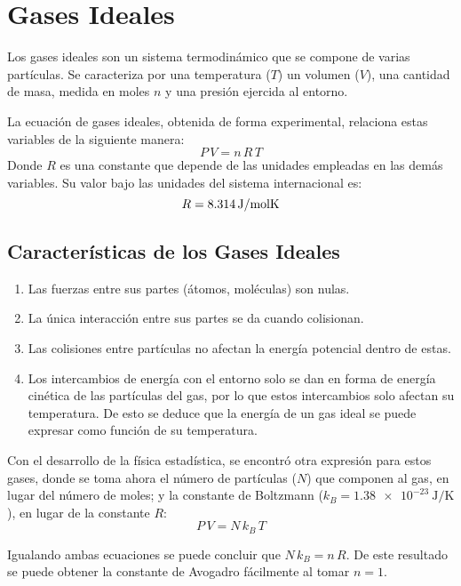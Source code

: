 \section{Gases Ideales}

Los gases ideales son un sistema termodinámico que se compone de varias
partículas. Se caracteriza por una temperatura ($T$) un volumen ($V$),
una cantidad de masa, medida en moles $n$ y una presión ejercida al
entorno.

\begin{center}
\end{center}

La ecuación de gases ideales, obtenida de forma experimental, relaciona
estas variables de la siguiente manera:
\[P\,V = n\,R\,T\]
Donde $R$ es una constante que depende de las unidades empleadas en las
demás variables. Su valor bajo las unidades del sistema internacional es:
\[R = \qty{8.314}{\joule\per{\mol \kelvin}}\]

\subsection{Características de los Gases Ideales}
\begin{enumerate}
  \item Las fuerzas entre sus partes (átomos, moléculas) son nulas.
  \item La única interacción entre sus partes se da cuando colisionan.
  \item Las colisiones entre partículas no afectan la energía potencial
        dentro de estas.
  \item Los intercambios de energía con el entorno solo se dan en forma
        de energía cinética de las partículas del gas, por lo que estos
        intercambios solo afectan su temperatura. De esto se deduce que
        la energía de un gas ideal se puede expresar como función de su
        temperatura.
\end{enumerate}

Con el desarrollo de la física estadística, se encontró otra expresión
para estos gases, donde se toma ahora el número de partículas ($N$) que
componen al gas, en lugar del número de moles; y la constante de
Boltzmann ($k_B = \qty{1.38e-23}{\joule\per\kelvin}$), en lugar de la
constante $R$:
\[P\,V = N\,k_B\,T\]

Igualando ambas ecuaciones se puede concluir que $N\,k_B = n\,R$. De
este resultado se puede obtener la constante de Avogadro fácilmente al
tomar $n=1$.